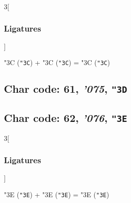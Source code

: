 \documentclass{article}
\newlength{\maxcharwidth}
\begin{document}

\begin{multicols}{3}[\subsubsection{Ligatures}]

{\testfont\char"3C\noboundary} ({\tt"3C}) + {\testfont\char"3C\noboundary} ({\tt"3C}) = {\testfont\char"3C\noboundary} ({\tt"3C}) 

\end{multicols}

\subsection{Char code: 61, {\it'075}, {\tt"3D}}
\label{char_61}


\subsection{Char code: 62, {\it'076}, {\tt"3E}}
\label{char_62}


\begin{multicols}{3}[\subsubsection{Ligatures}]

{\testfont\char"3E\noboundary} ({\tt"3E}) + {\testfont\char"3E\noboundary} ({\tt"3E}) = {\testfont\char"3E\noboundary} ({\tt"3E}) 

\end{multicols}
\end{document}
